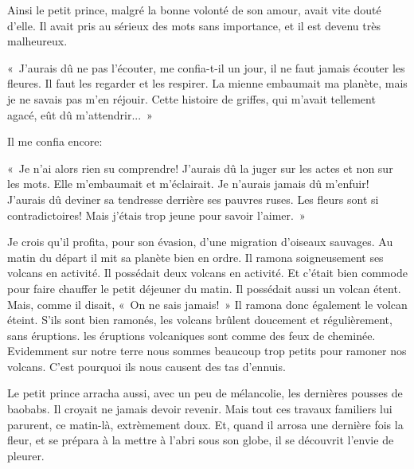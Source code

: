 \documentclass[a4paper]{report}
\begin{document}
Ainsi le petit prince, malgré la bonne volonté de son amour, avait vite douté d'elle. Il avait pris au sérieux des mots sans importance, et il est devenu très malheureux.

«~J'aurais dû ne pas l'écouter, me confia-t-il un jour, il ne faut jamais écouter les fleures. Il faut les regarder et les respirer. La mienne embaumait ma planète, mais je ne savais pas m'en réjouir. Cette histoire de griffes, qui m'avait tellement agacé, eût dû m'attendrir...~»

Il me confia encore:

«~Je n'ai alors rien su comprendre! J'aurais dû la juger sur les actes et non sur les mots. Elle m'embaumait et m'éclairait. Je n'aurais jamais dû m'enfuir! J'aurais dû deviner sa tendresse derrière ses pauvres ruses. Les fleurs sont si contradictoires! Mais j'étais trop jeune pour savoir l'aimer.~»

\parachapter[IX]{} %
Je crois qu'il profita, pour son évasion, d'une migration d'oiseaux sauvages. Au matin du départ il mit sa planète bien en ordre. Il ramona soigneusement ses volcans en activité. Il possédait deux volcans en activité. Et c'était bien commode pour faire chauffer le petit déjeuner du matin. Il possédait aussi un volcan étent. Mais, comme il disait, «~On ne sais jamais!~» Il ramona donc également le volcan éteint. S'ils sont bien ramonés, les volcans brûlent doucement et régulièrement, sans éruptions. les éruptions volcaniques sont comme des feux de cheminée. Evidemment sur notre terre nous sommes beaucoup trop petits pour ramoner nos volcans. C'est pourquoi ils nous causent des tas d'ennuis. 


Le petit prince arracha aussi, avec un peu de mélancolie, les dernières pousses de baobabs. Il croyait ne jamais devoir revenir. Mais tout ces travaux familiers lui parurent, ce matin-là, extrèmement doux. Et, quand il arrosa une dernière fois la fleur, et se prépara à la mettre à l'abri sous son globe, il se découvrit l'envie de pleurer.
\end{document}
